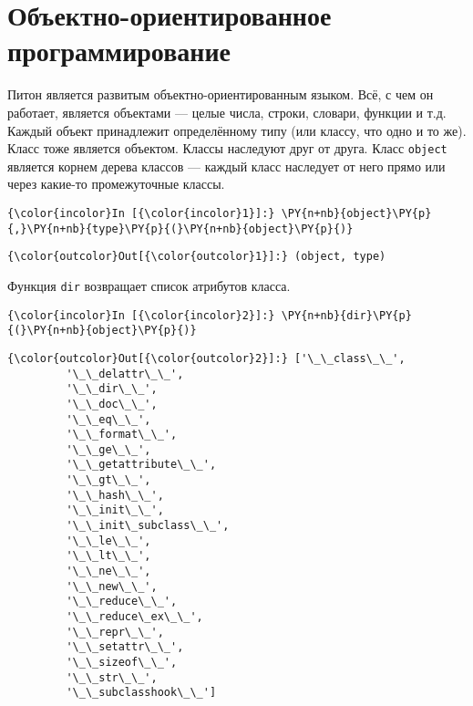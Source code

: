 \section{Объектно-ориентированное программирование}
\label{S108}

Питон является развитым объектно-ориентированным языком. Всё, с чем он
работает, является объектами --- целые числа, строки, словари, функции и
т.д. Каждый объект принадлежит определённому типу (или классу, что одно
и то же). Класс тоже является объектом. Классы наследуют друг от друга.
Класс \texttt{object} является корнем дерева классов --- каждый класс
наследует от него прямо или через какие-то промежуточные классы.

    \begin{Verbatim}[commandchars=\\\{\}]
{\color{incolor}In [{\color{incolor}1}]:} \PY{n+nb}{object}\PY{p}{,}\PY{n+nb}{type}\PY{p}{(}\PY{n+nb}{object}\PY{p}{)}
\end{Verbatim}

            \begin{Verbatim}[commandchars=\\\{\}]
{\color{outcolor}Out[{\color{outcolor}1}]:} (object, type)
\end{Verbatim}
        
    Функция \texttt{dir} возвращает список атрибутов класса.

    \begin{Verbatim}[commandchars=\\\{\}]
{\color{incolor}In [{\color{incolor}2}]:} \PY{n+nb}{dir}\PY{p}{(}\PY{n+nb}{object}\PY{p}{)}
\end{Verbatim}

            \begin{Verbatim}[commandchars=\\\{\}]
{\color{outcolor}Out[{\color{outcolor}2}]:} ['\_\_class\_\_',
         '\_\_delattr\_\_',
         '\_\_dir\_\_',
         '\_\_doc\_\_',
         '\_\_eq\_\_',
         '\_\_format\_\_',
         '\_\_ge\_\_',
         '\_\_getattribute\_\_',
         '\_\_gt\_\_',
         '\_\_hash\_\_',
         '\_\_init\_\_',
         '\_\_init\_subclass\_\_',
         '\_\_le\_\_',
         '\_\_lt\_\_',
         '\_\_ne\_\_',
         '\_\_new\_\_',
         '\_\_reduce\_\_',
         '\_\_reduce\_ex\_\_',
         '\_\_repr\_\_',
         '\_\_setattr\_\_',
         '\_\_sizeof\_\_',
         '\_\_str\_\_',
         '\_\_subclasshook\_\_']
\end{Verbatim}
        
